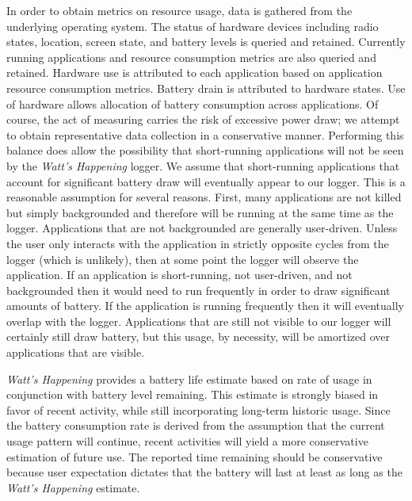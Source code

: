 In order to obtain metrics on resource usage, data is gathered from the underlying operating system.
The status of hardware devices including radio states, location, screen state, and battery levels is queried and retained.
Currently running applications and resource consumption metrics are also queried and retained. 
Hardware use is attributed to each application based on application resource consumption metrics. 
Battery drain is attributed to hardware states.
Use of hardware allows allocation of battery consumption across applications.
Of course, the act of measuring carries the risk of excessive power draw; we attempt to obtain representative data collection in a conservative manner.
Performing this balance does allow the possibility that short-running applications will not be seen by the \emph{Watt's Happening} logger.
We assume that short-running applications that account for significant battery draw will eventually appear to our logger.
This is a reasonable assumption for several reasons.
First, many applications are not killed but simply backgrounded and therefore will be running at the same time as the logger.
Applications that are not backgrounded are generally user-driven.
Unless the user only interacts with the application in strictly opposite cycles from the logger (which is unlikely), then at some point the logger will observe the application.
If an application is short-running, not user-driven, and not backgrounded then it would need to run frequently in order to draw significant amounts of battery.
If the application is running frequently then it will eventually overlap with the logger.
Applications that are still not visible to our logger will certainly still draw battery, but this usage, by necessity, will be amortized over applications that are visible.

\emph{Watt's Happening} provides a battery life estimate based on rate of usage in conjunction with battery level remaining.
This estimate is strongly biased in favor of recent activity, while still incorporating long-term historic usage. 
Since the battery consumption rate is derived from the assumption that the current usage pattern will continue, recent activities will yield a more conservative estimation of future use.
The reported time remaining should be conservative because user expectation dictates that the battery will last at least as long as the \emph{Watt's Happening} estimate.

